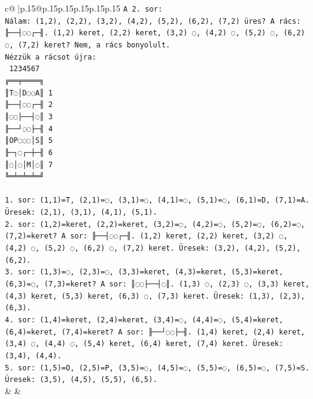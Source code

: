 \documentclass{article}
\begin{document}
{\begin{supertabular}{c@{$\;$}|p{.15\linewidth}@{}p{.15\linewidth}p{.15\linewidth}p{.15\linewidth}p{.15\linewidth}p{.15\linewidth}}
{{{\texttt{A 2. sor:} \\
\texttt{Nálam: (1,2), (2,2), (3,2), (4,2), (5,2), (6,2), (7,2) üres? A rács: ╟──┤◌◌┌─╢. (1,2) keret, (2,2) keret, (3,2) ◌, (4,2) ◌, (5,2) ◌, (6,2) ◌, (7,2) keret? Nem, a rács bonyolult.} \\
\texttt{Nézzük a rácsot újra:} \\
\texttt{ 1234567} \\
\texttt{╔══╤════╗} \\
\texttt{║T◌│D◌◌A║ 1} \\
\texttt{╟──┤◌◌┌─╢ 2} \\
\texttt{║◌◌├──┤◌║ 3} \\
\texttt{╟──┘◌◌├─╢ 4} \\
\texttt{║OP◌◌◌│S║ 5} \\
\texttt{╟─┐◌┌─┼─╢ 6} \\
\texttt{║◌│◌│M│◌║ 7} \\
\texttt{╚═╧═╧═╧═╝} \\
\\ 
\texttt{1. sor: (1,1)=T, (2,1)=◌, (3,1)=◌, (4,1)=◌, (5,1)=◌, (6,1)=D, (7,1)=A. Üresek: (2,1), (3,1), (4,1), (5,1).} \\
\texttt{2. sor: (1,2)=keret, (2,2)=keret, (3,2)=◌, (4,2)=◌, (5,2)=◌, (6,2)=◌, (7,2)=keret? A sor: ╟──┤◌◌┌─╢. (1,2) keret, (2,2) keret, (3,2) ◌, (4,2) ◌, (5,2) ◌, (6,2) ◌, (7,2) keret. Üresek: (3,2), (4,2), (5,2), (6,2).} \\
\texttt{3. sor: (1,3)=◌, (2,3)=◌, (3,3)=keret, (4,3)=keret, (5,3)=keret, (6,3)=◌, (7,3)=keret? A sor: ║◌◌├──┤◌║. (1,3) ◌, (2,3) ◌, (3,3) keret, (4,3) keret, (5,3) keret, (6,3) ◌, (7,3) keret. Üresek: (1,3), (2,3), (6,3).} \\
\texttt{4. sor: (1,4)=keret, (2,4)=keret, (3,4)=◌, (4,4)=◌, (5,4)=keret, (6,4)=keret, (7,4)=keret? A sor: ╟──┘◌◌├─╢. (1,4) keret, (2,4) keret, (3,4) ◌, (4,4) ◌, (5,4) keret, (6,4) keret, (7,4) keret. Üresek: (3,4), (4,4).} \\
\texttt{5. sor: (1,5)=O, (2,5)=P, (3,5)=◌, (4,5)=◌, (5,5)=◌, (6,5)=◌, (7,5)=S. Üresek: (3,5), (4,5), (5,5), (6,5).} \\
            }
        }
    }
    & & \\ \\


\end{supertabular}}
\end{document}
